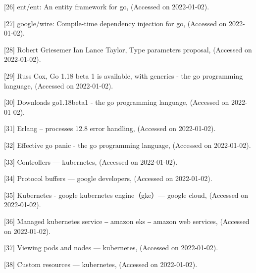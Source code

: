 {[}26{]} ent/ent: An entity framework for go,
(Accessed on 2022-01-02).

{[}27{]} google/wire: Compile-time dependency injection for go,
(Accessed on 2022-01-02).

{[}28{]} Robert Griesemer Ian Lance Taylor, Type parameters proposal,
(Accessed on 2022-01-02).

{[}29{]} Russ Cox, Go 1.18 beta 1 is available, with generics - the go
programming language, 
(Accessed on 2022-01-02).

{[}30{]} Downloads go1.18beta1 - the go programming language,
(Accessed on 2022-01-02).

{[}31{]} Erlang -- processes 12.8 error handling,
(Accessed on 2022-01-02).

{[}32{]} Effective go panic - the go programming language,
(Accessed on 2022-01-02).

{[}33{]} Controllers --- kubernetes,
(Accessed on 2022-01-02).

{[}34{]} Protocol buffers --- google developers,
(Accessed on 2022-01-02).

{[}35{]} Kubernetes - google kubernetes engine（gke）--- google cloud,
(Accessed on 2022-01-02).

{[}36{]} Managed kubernetes service ‒ amazon eks ‒ amazon web services,
(Accessed on 2022-01-02).

{[}37{]} Viewing pods and nodes --- kubernetes,
(Accessed on 2022-01-02).

{[}38{]} Custom resources --- kubernetes,
(Accessed on 2022-01-02).
